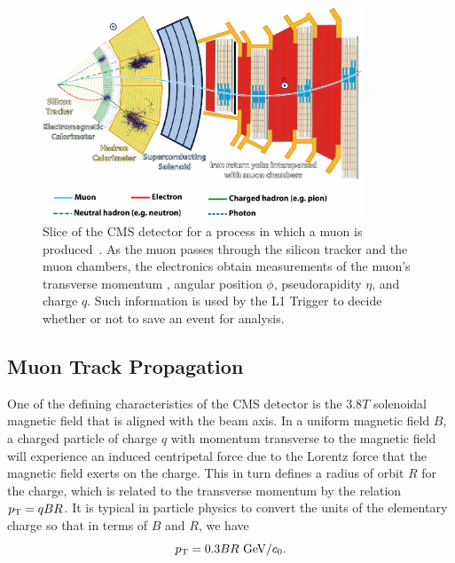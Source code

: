 \begin{figure}[htbp]
  \centering
  \includegraphics[width=0.85\textwidth]{fig/TPS/CMSslice_whiteBackground.pdf}
  \caption[
    Slice of the CMS detector for a process in which a muon is produced.
    As the muon passes through the silicon tracker and the muon chambers, the electronics obtain measurements of the muon's transverse momentum \pt, angular position $\phi$, pseudorapidity $\eta$, and charge $q$.
    Such information is used by the L1 Trigger to decide whether or not to save an event for analysis.
  ]{
    Slice of the CMS detector for a process in which a muon is produced~\cite{Barney:2120661}.
    As the muon passes through the silicon tracker and the muon chambers, the electronics obtain measurements of the muon's transverse momentum \pt, angular position $\phi$, pseudorapidity $\eta$, and charge $q$.
    Such information is used by the L1 Trigger to decide whether or not to save an event for analysis.
  }
  \label{fig:CMSslice}
\end{figure}

\subsection{Muon Track Propagation}
\label{subsec:prop}

One of the defining characteristics of the CMS detector is the $3.8\unit{T}$ solenoidal magnetic field that is aligned with the beam axis.
In a uniform magnetic field $B$, a charged particle of charge $q$ with momentum transverse to the magnetic field \pt will experience an induced centripetal force due to the Lorentz force that the magnetic field exerts on the charge.
This in turn defines a radius of orbit $R$ for the charge, which is related to the transverse momentum \pt by the relation $p_\mathrm{T}=qBR$.
It is typical in particle physics to convert the units of the elementary charge so that in terms of $B$ and $R$, we have
\begin{equation}\label{eq:pt}
  \pt=0.3BR\unit{GeV/\clight}.
\end{equation}

